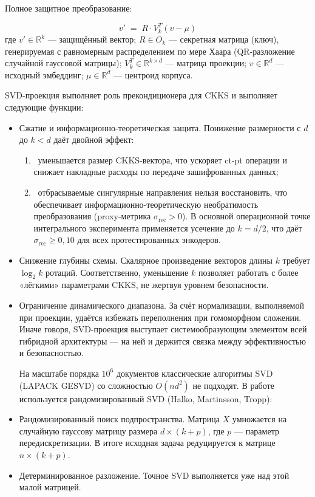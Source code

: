 \documentclass[a4paper, 12pt, oneside, openany]{article}
\begin{document}
Полное защитное преобразование:

\begin{equation}
	v' \;=\; R \cdot V_{k}^{T}(v - \mu)
	\label{eq:2-16}
\end{equation}
где $v' \in \mathbb{R}^{k}$ --- защищённый вектор; $R \in O_{k}$ --- секретная матрица (ключ), генерируемая с равномерным распределением по мере Хаара (QR-разложение случайной гауссовой матрицы); $V_{k}^{T} \in \mathbb{R}^{k \times d}$ --- матрица проекции; $v \in \mathbb{R}^{d}$ --- исходный эмбеддинг; $\mu \in \mathbb{R}^{d}$ --- центроид корпуса.


SVD-проекция выполняет роль прекондиционера для CKKS и выполняет следующие функции:
\begin{itemize}
	\item
	Сжатие и информационно-теоретическая защита. Понижение размерности с $d$ до $k < d$ даёт двойной эффект: 
	
	\begin{enumerate}

	\item ~уменьшается размер CKKS-вектора, что ускоряет ct-pt операции и снижает накладные расходы по передаче зашифрованных данных;
	
	\item ~отбрасываемые сингулярные направления нельзя восстановить, что обеспечивает информационно-теоретическую необратимость преобразования (proxy-метрика $\sigma_{\mathrm{rec}} > 0$). В основной операционной точке интегрального эксперимента применяется усечение до $k = d/2$, что даёт $\sigma_{\mathrm{rec}} \geq 0{,}10$ для всех протестированных энкодеров.
\end{enumerate}

\item Снижение глубины схемы. Скалярное произведение векторов длины $k$ требует $\log_2 k$ ротаций. Соответственно, уменьшение $k$ позволяет работать с более «лёгкими» параметрами CKKS, не жертвуя уровнем безопасности.

\item Ограничение динамического диапазона. За счёт нормализации, выполняемой при проекции, удаётся избежать переполнения при гомоморфном сложении.
Иначе говоря, SVD-проекция выступает системообразующим элементом всей гибридной архитектуры — на ней и держится связка между эффективностью и безопасностью.

На масштабе порядка $10^6$ документов классические алгоритмы SVD (LAPACK GESVD) со сложностью $O(nd^2)$ не подходят. В работе используется рандомизированный SVD (Halko, Martinsson, Tropp):

	\item
	Рандомизированный поиск подпространства. Матрица $X$ умножается на случайную гауссову матрицу размера $d \times (k + p)$, где $p$ — параметр передискретизации. В итоге исходная задача редуцируется к матрице $n \times (k + p)$.


\item Детерминированное разложение. Точное SVD выполняется уже над этой малой матрицей.

\end{itemize}
\end{document}
